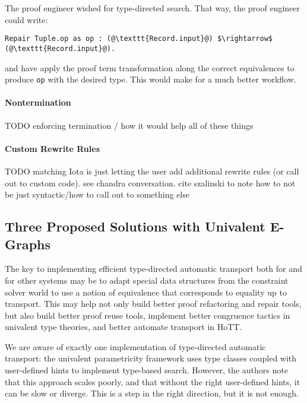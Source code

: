 The proof engineer wished for type-directed search.
That way, the proof engineer could write:

\begin{lstlisting}
Repair Tuple.op as op : (@\texttt{Record.input}@) $\rightarrow$ (@\texttt{Record.input}@).
\end{lstlisting}
and have \toolname apply the proof term transformation along the correct equivalences
to produce \lstinline{op} with the desired type.
This would make for a much better workflow.

\paragraph{Nontermination}

TODO enforcing termination / how it would help all of these things

\paragraph{Custom Rewrite Rules}

TODO matching Iota is just letting the user add additional rewrite rules (or call out to custom code).
see chandra conversation.
cite szalinski to note how to not be just syntactic/how to call out to something else

\subsection{Three Proposed Solutions with Univalent E-Graphs}
\label{sec:egraph}



The key to implementing efficient type-directed automatic transport both for \toolname
and for other systems may be to adapt special data structures from the constraint solver world to use a
notion of equivalence that corresponds to equality up to transport.
This may help not only build better proof refactoring and repair tools, but also build better proof reuse tools,
implement better congruence tactics in univalent type theories, and better automate transport in HoTT.


We are aware of exactly one implementation of type-directed automatic transport:
the univalent parametricity framework uses type classes coupled with user-defined hints to implement type-based search.
However, the authors note that this approach scales poorly, and that without the right user-defined
hints, it can be slow or diverge.
This is a step in the right direction, but it is not enough.

